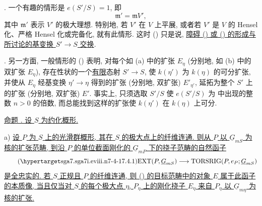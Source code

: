 \smallskip
\noindent {}. 一个有趣的情形是 $e(S'/S)=1$, 即
\[
 \mathfrak m'=\mathfrak m V',
\]
其中 $\mathfrak m'$ 表示 $V'$ 的极大理想. 特别地, 若 $V'$ 在 $V$ 上平展, 或者若 $V'$ 是 $V$ 的 Hensel 化、严格 Hensel 化或完备化, 就有此情形. 这时 () 只是说, \underline{障碍 () 或 () 的形成与所讨论的基变换 $S'\to S$ 交换}.

\smallskip
\noindent {}. 另一方面, 一般情形的 () 表明, 对每个如 (a) 中的扩张 $E_\eta$ (分别地, 如 (b) 中的双扩张 $E_\eta$), 存在性状的一个\underline{有限}态射 $S'\to S$, 使 $k(\eta')$ 为 $k(\eta)$ 的可分扩张, 并使从 $E_\eta$ 经基变换 $\eta'\to\eta$ 得到的扩张 (分别地, 双扩张) $E'_{\eta'}$, 延拓为整个 $S'$ 上的扩张 (分别地, 双扩张) $E'$. 事实上, 只须选取 $S'/S$ 使 $e(S'/S)$ 为  中出现的整数 $n>0$ 的倍数, 而总能找到这样的扩张使 $k(\eta')$ 在 $k(\eta)$ 上可分.



\medskip
\noindent\underline{命题 . 设 $S$ 为约化概形.}

\smallskip
\noindent a) \underline{设 $P$ 为 $S$ 上的光滑群概形, 其在 $S$ 的极大点上的纤维连通. 则从 $P$ 以 $\underline G_{mS}$ 为核的扩张范畴, 到沿 $P$ 的单位截面刚化的 $\underline G_{mP}$ 下的挠子范畴的自然函子}
\begin{equation}\tag{\SGARefTarget{sga7.sga7i.eviii.n7-4-1}{7.4.1}}
 \mathrm{EXT}(P,\underline G_{mS})
 \longrightarrow
 \mathrm{TORSRIG}(P,e_P;\underline G_{mS})
\end{equation}
\underline{是全忠实的. 若 $S$ 正规且 $P$ 的纤维连通, 则 () 的目标范畴中的对象 $E$ 属于此函子的本质像, 当且仅当对 $S$ 的每个极大点 $\eta$, $P_\eta$ 上的刚化挠子 $E_\eta$ 来自 $P_\eta$ 以 $\underline G_{m\eta}$ 为核的扩张.}

